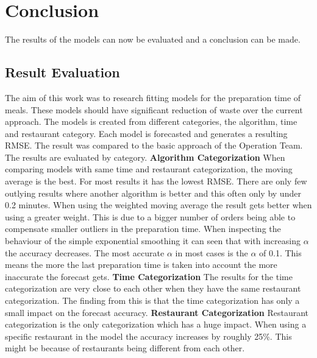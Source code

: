\chapter{Conclusion}\label{chapter:Conclusion}
The results of the models can now be evaluated and a conclusion can be made.
\section{Result Evaluation}
The aim of this work was to research fitting models for the preparation time of meals. These models should have significant reduction of waste over the current approach.\newline
The models is created from different categories, the algorithm, time and restaurant category. Each model is forecasted and generates a resulting RMSE. The result was compared to the basic approach of the Operation Team.\newline
The results are evaluated by category.\newline
\newline\textbf{Algorithm Categorization}\newline
When comparing models with same time and restaurant categorization, the moving average is the best. For most results it has the lowest RMSE. There are only few outlying results where another algorithm is better and this often only by under 0.2 minutes.\newline
When using the weighted moving average the result gets better when using a greater weight. This is due to a bigger number of orders being able to compensate smaller outliers in the preparation time.\newline
When inspecting the behaviour of the simple exponential smoothing it can seen that with increasing $\alpha$ the accuracy decreases. The most accurate $\alpha$ in most cases is the $\alpha$ of 0.1. This means the more the last preparation time is taken into account the more inaccurate the forecast gets.
\newline\textbf{Time Categorization}\newline
The results for the time categorization are very close to each other when they have the same restaurant categorization. The finding from this is that the time categorization has only a small impact on the forecast accuracy.
\newline\textbf{Restaurant Categorization}\newline
Restaurant categorization is the only categorization which has a huge impact. When using a specific restaurant in the model the accuracy increases by roughly 25\%. This might be because of restaurants being different from each other.

